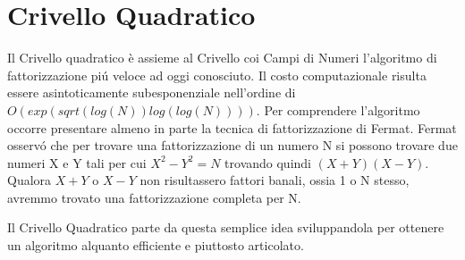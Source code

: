 \section{Crivello Quadratico}
\label{sec:crivello}

\begin{flushleft}


Il Crivello quadratico è assieme al Crivello coi Campi di Numeri l'algoritmo di fattorizzazione
pi\'{u} veloce ad oggi conosciuto.
Il costo computazionale risulta essere asintoticamente subesponenziale nell'ordine di
$O(exp(sqrt(log(N))log(log(N))))$.
Per comprendere l'algoritmo occorre presentare almeno in parte la tecnica di fattorizzazione di
Fermat.
Fermat osserv\'{o} che per trovare una fattorizzazione di un numero N si possono trovare due 
numeri X e Y tali per cui $X^2-Y^2 = N$ trovando quindi $(X+Y)(X-Y)$.
Qualora $X+Y$ o $X-Y$ non risultassero fattori banali, ossia 1 o N stesso, avremmo trovato una
fattorizzazione completa per N.

Il Crivello Quadratico parte da questa semplice idea sviluppandola per ottenere un algoritmo 
alquanto efficiente e piuttosto articolato.


\end{flushleft}
